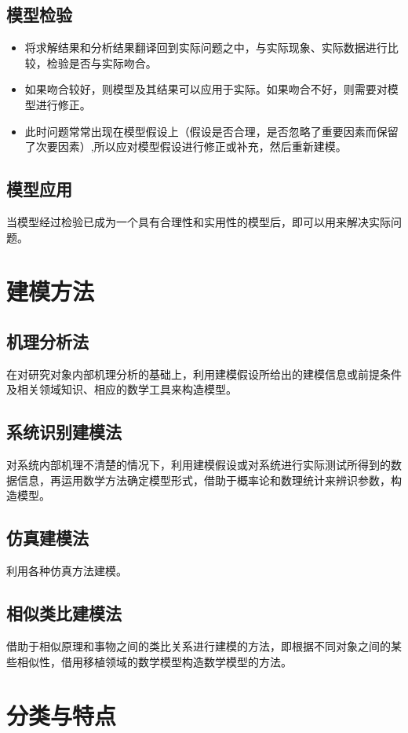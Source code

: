 \documentclass[openany]{progbookcn}
\begin{document}
\subsection{模型检验}
\begin{itemize}
\item 将求解结果和分析结果翻译回到实际问题之中，与实际现象、实际数据进行比较，检验是否与实际吻合。
\item 如果吻合较好，则模型及其结果可以应用于实际。如果吻合不好，则需要对模型进行修正。
\item 此时问题常常出现在模型假设上（假设是否合理，是否忽略了重要因素而保留了次要因素）,所以应对模型假设进行修正或补充，然后重新建模。 

\end{itemize}
\subsection{模型应用}
当模型经过检验已成为一个具有合理性和实用性的模型后，即可以用来解决实际问题。
\section{建模方法}

\subsection{机理分析法}
在对研究对象内部机理分析的基础上，利用建模假设所给出的建模信息或前提条件及相关领域知识、相应的数学工具来构造模型。
\subsection{系统识别建模法}
对系统内部机理不清楚的情况下，利用建模假设或对系统进行实际测试所得到的数据信息，再运用数学方法确定模型形式，借助于概率论和数理统计来辨识参数，构造模型。
\subsection{仿真建模法}
利用各种仿真方法建模。
\subsection{相似类比建模法}
借助于相似原理和事物之间的类比关系进行建模的方法，即根据不同对象之间的某些相似性，借用移植领域的数学模型构造数学模型的方法。


\section{分类与特点}
\end{document}
